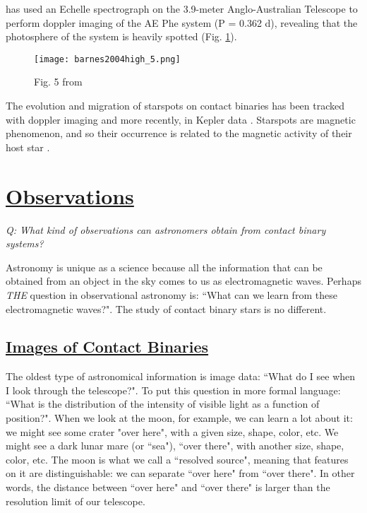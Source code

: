 \documentclass[12pt]{article} %
\numberwithin{equation}{section} %
\begin{document}
\citet{barnes2004high} has used an Echelle spectrograph on the 3.9-meter Anglo-Australian Telescope to perform doppler imaging of the AE Phe system (P = 0.362 d), revealing that the photosphere of the system is heavily spotted (Fig. \ref{fig: barnes2004high_5}).

\begin{figure}[H]
\centering
\texttt{[image: barnes2004high\_5.png]}
\caption{Fig. 5 from \citet{barnes2004high}}
\label{fig: barnes2004high_5}
\end{figure}

The evolution and migration of starspots on contact binaries has been tracked with doppler imaging \citep{hendry2000doppler} and more recently, in Kepler data \citep{tran2013anticorrelated, balaji2015tracking}. Starspots are magnetic phenomenon, and so their occurrence is related to the magnetic activity of their host star \citep{berdyugina2005starspots}.  

\section[Observations]{\hyperlink{toc}{Observations}} \label{sec: observations}

\emph{Q: What kind of observations can astronomers obtain from contact binary systems?}

Astronomy is unique as a science because all the information that can be obtained from an object in the sky comes to us as electromagnetic waves. Perhaps \emph{THE} question in observational astronomy is: ``What can we learn from these electromagnetic waves?". The study of contact binary stars is no different. 

\subsection[Images of Contact Binaries]{\hyperlink{toc}{Images of Contact Binaries}} \label{sec: Images of Contact Binaries}

The oldest type of astronomical information is image data: ``What do I see when I look through the telescope?". To put this question in more formal language: ``What is the distribution of the intensity of visible light as a function of position?". When we look at the moon, for example, we can learn a lot about it: we might see some crater "over here", with a given size, shape, color, etc. We might see a dark lunar mare (or ``sea"), ``over there", with another size, shape, color, etc. The moon is what we call a ``resolved source", meaning that features on it are distinguishable: we can separate ``over here" from ``over there". In other words, the distance between ``over here" and ``over there" is larger than the resolution limit of our telescope.
\end{document}
